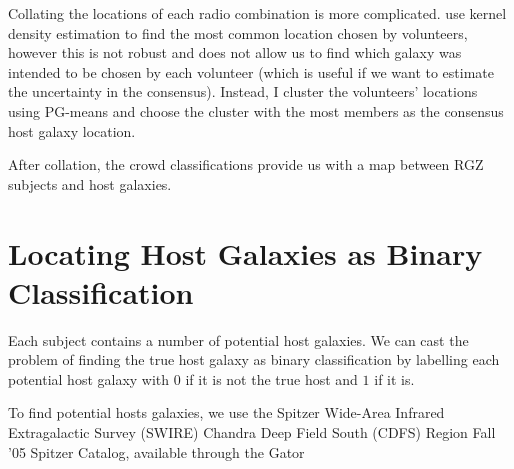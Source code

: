 \documentclass[a4paper]{article}
\begin{document}
        Collating the locations of each radio combination is more complicated. \citet{banfield15} use kernel density estimation to find the most common location chosen by volunteers, however this is not robust and does not allow us to find which galaxy was intended to be chosen by each volunteer (which is useful if we want to estimate the uncertainty in the consensus). Instead, I cluster the volunteers' locations using PG-means\citep{hamerly07} and choose the cluster with the most members as the consensus host galaxy location.

        After collation, the crowd classifications provide us with a map between RGZ subjects and host galaxies.

    \section{Locating Host Galaxies as Binary Classification}

        Each subject contains a number of potential host galaxies. We can cast the problem of finding the true host galaxy as binary classification by labelling each potential host galaxy with $0$ if it is not the true host and $1$ if it is.

        To find potential hosts galaxies, we use the Spitzer Wide-Area Infrared Extragalactic Survey (SWIRE) Chandra Deep Field South (CDFS) Region Fall '05 Spitzer Catalog\citep{lonsdale03}, available through the Gator 

    
    
\end{document}
